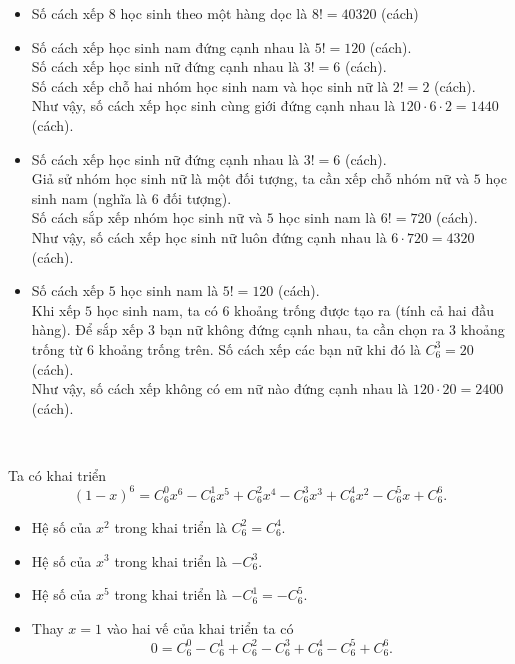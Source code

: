 \def\writeANS{\TLdung{A}\TLdung{B}\TLdung{C}\TLdung{D}}
\begin{loigiaiex}{13}
  \begin {itemize} \item Số cách xếp $8$ học sinh theo một hàng dọc là $8!=40320$ (cách) \item Số cách xếp học sinh nam đứng cạnh nhau là $5!=120$ (cách).\\ Số cách xếp học sinh nữ đứng cạnh nhau là $3!=6$ (cách).\\ Số cách xếp chỗ hai nhóm học sinh nam và học sinh nữ là $2!=2$ (cách).\\ Như vậy, số cách xếp học sinh cùng giới đứng cạnh nhau là $120\cdot 6\cdot 2=1440$ (cách). \item Số cách xếp học sinh nữ đứng cạnh nhau là $3!=6$ (cách).\\ Giả sử nhóm học sinh nữ là một đối tượng, ta cần xếp chỗ nhóm nữ và $5$ học sinh nam (nghĩa là $6$ đối tượng).\\ Số cách sắp xếp nhóm học sinh nữ và $5$ học sinh nam là $6!=720$ (cách).\\ Như vậy, số cách xếp học sinh nữ luôn đứng cạnh nhau là $6\cdot 720=4320$ (cách). \item Số cách xếp $5$ học sinh nam là $5!=120$ (cách).\\ Khi xếp $5$ học sinh nam, ta có $6$ khoảng trống được tạo ra (tính cả hai đầu hàng). Để sắp xếp $3$ bạn nữ không đứng cạnh nhau, ta cần chọn ra $3$ khoảng trống từ $6$ khoảng trống trên. Số cách xếp các bạn nữ khi đó là $C^3_6=20$ (cách).\\ Như vậy, số cách xếp không có em nữ nào đứng cạnh nhau là $120\cdot 20=2400$ (cách). \end {itemize}  \phantom {a}\hfill { \faKey ~\writeANS } 
\end{loigiaiex}
\def\writeANS{\TLsai{B}\TLdung{C}\TLsai{D}}
\begin{loigiaiex}{14}
  Ta có khai triển $$(1-x)^6=C^0_6 x^6 -C^1_6 x^5+ C^2_6 x^4 - C^3_6 x^3 +C^4_6 x^2- C^5_6 x +C^6_6.$$ \begin {itemize} \item Hệ số của $x^2$ trong khai triển là $C_6^2=C^4_6$. \item Hệ số của $x^3$ trong khai triển là $-C_6^3$. \item Hệ số của $x^5$ trong khai triển là $-C_6^1=-C^5_6$. \item Thay $x=1$ vào hai vế của khai triển ta có $$0=C_6^0-C_6^1+C_6^2-C_6^3+C_6^4-C_6^5+C_6^6.$$ \end {itemize}  \phantom {a}\hfill { \faKey ~\writeANS } 
\end{loigiaiex}
